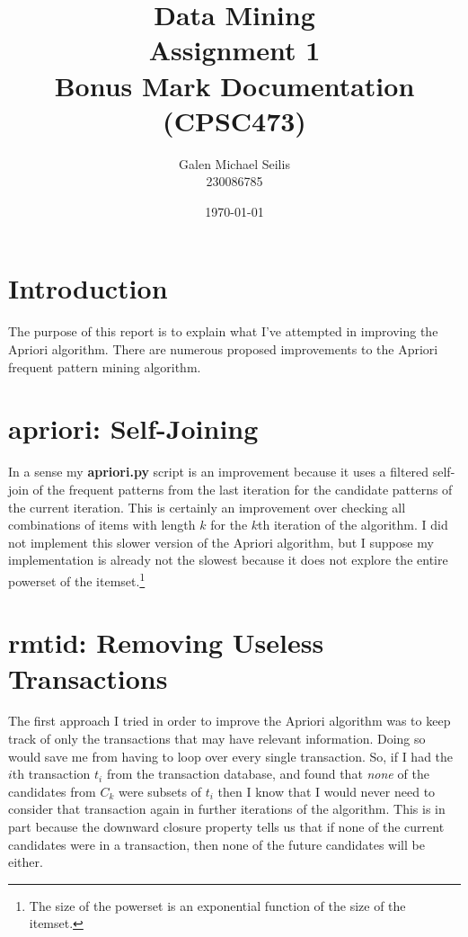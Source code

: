 \documentclass[12 pt]{article}
\title{Data Mining\\Assignment 1\\Bonus Mark Documentation\\(CPSC473)}
\author{Galen Michael Seilis \\230086785}
\date{\today}
\begin{document}
\maketitle
\pagebreak

\section{Introduction}
The purpose of this report is to explain what I've attempted in improving the Apriori algorithm. There are numerous proposed improvements to the Apriori frequent pattern mining algorithm.\cite{Park1995, Gu2011, AlMaolegi2014, Yuan2017, Liu2017}

\section{apriori: Self-Joining}

In a sense my \textbf{apriori.py} script is an improvement because it uses a filtered self-join of the frequent patterns from the last iteration for the candidate patterns of the current iteration. This is certainly an improvement over checking all combinations of items with length $k$ for the $k$th iteration of the algorithm. I did not implement this slower version of the Apriori algorithm, but I suppose my implementation is already not the slowest because it does not explore the entire powerset of the itemset.\footnote{The size of the powerset is an exponential function of the size of the itemset.}

\section{rmtid: Removing Useless Transactions}

The first approach I tried in order to improve the Apriori algorithm was to keep track of only the transactions that may have relevant information. Doing so would save me from having to loop over every single transaction. So, if I had the $i$th transaction $t_i$ from the transaction database, and found that \textit{none} of the candidates from $C_k$ were subsets of $t_i$ then I know that I would never need to consider that transaction again in further iterations of the algorithm. This is in part because the downward closure property tells us that if none of the current candidates were in a transaction, then none of the future candidates will be either.\\
\end{document}
